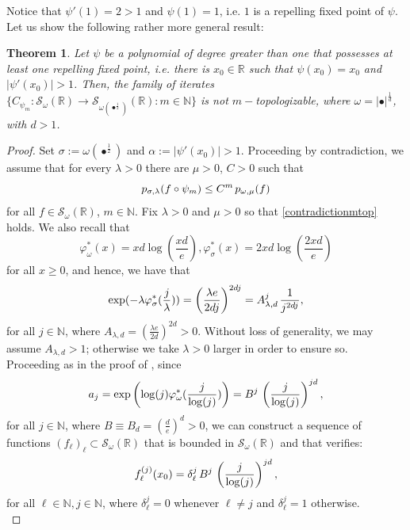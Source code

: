 \documentclass[12pt,reqno]{amsart} %
\newtheorem{theorem}{Theorem}[section]
\numberwithin{equation}{section}
\begin{document}
Notice that $\psi'(1)=2>1$ and $\psi(1)=1$, i.e. $1$ is a repelling fixed point of $\psi$. Let us show the following rather more general result: \begin{theorem}\label{repellingfixedpoint}
Let $\psi$ be a polynomial of degree greater than one that possesses at least one repelling fixed point, i.e. there is $x_0\in\mathbb{R}$ such that $\psi(x_0)=x_0$ and $|\psi'(x_0)|>1$. Then, the family of iterates $\{C_{\psi_m}:\mathcal{S}_{\omega}(\mathbb{R})\to \mathcal{S}_{\omega(\bullet^{\frac{1}{2}})}(\mathbb{R}):m\in\mathbb{N}\}$ is not $m-$topologizable, where $\omega=|\bullet|^{\frac{1}{d}}$, with $d>1$.
\end{theorem}

\begin{proof}
Set $\sigma:= \omega(\bullet^{\frac{1}{2}})$ and $\alpha:=|\psi'(x_0)|>1$. Proceeding by contradiction, we assume that for every $\lambda>0$ there are $\mu>0$, $C>0$ such that \begin{equation}\label{contradictionmtop}
	p_{\sigma, \lambda}(f\circ \psi_m)\leq C^m \hspace{0.05cm} p_{\omega, \mu}(f)
\end{equation} for all $f\in \mathcal{S}_{\omega}(\mathbb{R})$, $m\in\mathbb{N}$. Fix $\lambda>0$ and $\mu>0$ so that \eqref{contradictionmtop} holds. We also recall that 
\begin{equation*}
	\varphi_\omega^\ast(x) = xd\log\left(\frac{xd}{e}\right), \varphi_\sigma^\ast(x)=2xd\log\left(\frac{2xd}{e}\right)\end{equation*} 
for all $x\geq 0$, and hence, we have that $$\exp(-\lambda \varphi_\sigma^\ast(\frac{j}{\lambda}))=\left(\frac{\lambda e}{2dj}\right)^{2dj}=A_{\lambda, d}^j\hspace{0.05cm}\frac{1}{j^{2dj}},$$ for all $j\in\mathbb{N}$, where $A_{\lambda, d}=(\frac{\lambda e}{2d})^{2d}>0$. Without loss of generality, we may assume $A_{\lambda, d}>1$; otherwise we take $\lambda>0$ larger in order to ensure so. \\



Proceeding as in the proof of \cite[Theorem 3.5.]{jmaa}, since $$a_j=\exp\left(\log(j)\varphi_\omega^\ast(\frac{j}{\log(j)})\right)=B^j\hspace{0.05cm} \left(\frac{j}{\log(j)}\right)^{jd},$$ for all $j\in\mathbb{N}$, where $B\equiv B_d=(\frac{d}{e})^d>0$, we can construct a sequence of functions $(f_\ell)_\ell \subset \mathcal{S}_{\omega}(\mathbb{R})$ that is bounded in $\mathcal{S}_{\omega}(\mathbb{R})$ and that verifies: \begin{equation*}
	f_\ell^{(j)}(x_0)=\delta_{\ell}^j \hspace{0.05cm} B^j \hspace{0.05cm}\left(\frac{j}{\log(j)}\right)^{jd},
\end{equation*} for all $\ell\in\mathbb{N}, j\in\mathbb{N}$, where $\delta_{\ell}^j=0$ whenever $\ell\not=j$ and $\delta_{\ell}^j=1$ otherwise. \\


\end{proof}
\end{document}
